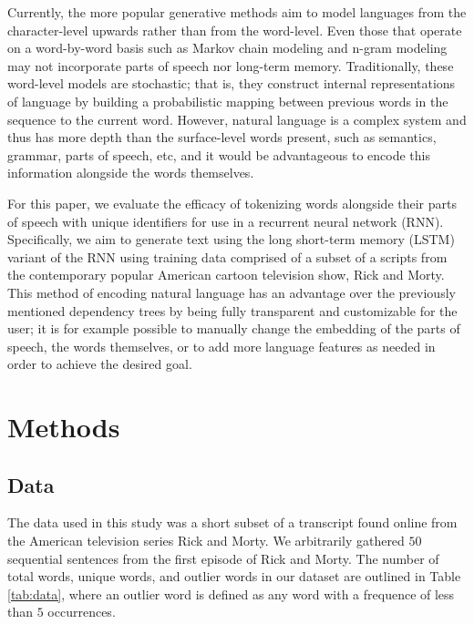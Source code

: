 \documentclass[conference]{IEEEtran}
\begin{document}
Currently, the more popular generative methods aim to model languages from the character-level upwards rather than from the word-level. Even those that operate on a word-by-word basis such as Markov chain modeling \cite{conroy2001text} and n-gram modeling \cite{masataki1996variable} may not incorporate parts of speech nor long-term memory. Traditionally, these word-level models are stochastic; that is, they construct internal representations of language by building a probabilistic mapping between previous words in the sequence to the current word. However, natural language is a complex system\cite{beckner2009language} and thus has more depth than the surface-level words present, such as semantics, grammar, parts of speech, etc, and it would be advantageous to encode this information alongside the words themselves.

For this paper, we evaluate the efficacy of tokenizing words alongside their parts of speech with unique identifiers for use in a recurrent neural network (RNN). Specifically, we aim to generate text using the long short-term memory (LSTM) variant of the RNN using training data comprised of a subset of a scripts from the contemporary popular American cartoon television show, Rick and Morty. This method of encoding natural language has an advantage over the previously mentioned dependency trees by being fully transparent and customizable for the user; it is for example possible to manually change the embedding of the parts of speech, the words themselves, or to add more language features as needed in order to achieve the desired goal.

\section{Methods}

\subsection{Data}

The data used in this study was a short subset of a transcript found online\cite{rickandmorty} from the American television series Rick and Morty. We arbitrarily gathered $50$ sequential sentences from the first episode of Rick and Morty. The number of total words, unique words, and outlier words in our dataset are outlined in Table \ref{tab:data}, where an outlier word is defined as any word with a frequence of less than $5$ occurrences.
\end{document}
